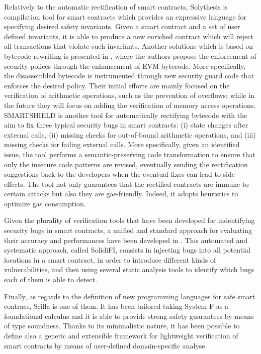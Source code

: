 Relatively to the automatic rectification of smart contracts, Solythesis \cite{solythesis_solidity_validation} is compilation tool for smart contracts which provides an expressive language for specifying desired safety invariants. Given a smart contract and a set of user defined invariants, it is able to produce a new enriched contract which will reject all transactions that violate such invariants.
%
Another solutions which is based on bytecode rewriting is presented in \cite{bytecode_rewriting}, where the authors propose the enforcement of security polices through the enhancement of EVM bytecode. More specifically, the disassembled bytecode is instrumented through new security guard code that enforces the desired policy. Their initial efforts are mainly focused on the  verification of arithmetic operations, such as the prevention of overflows; while in the future they will focus on
adding the verification of memory access operations.
%
SMARTSHIELD \cite{smartshield} is another tool for automatically rectifying bytecode with the aim to fix three typical security bugs in smart contracts:
(i) state changes after external calls, (ii) missing checks for out-of-bound arithmetic operations, and (iii) missing checks for failing external calls. More specifically, given an identified issue, the tool performs a semantic-preserving code transformation to ensure that only the insecure code patterns are revised, eventually  sending the rectification suggestions back to the developers when the eventual fixes can lead to side effects. The tool not only guarantees that the rectified contracts are immune to certain attacks but also they are gas-friendly. Indeed, it adopts heuristics to optimize gas consumption. 

Given the plurality of verification tools that have been developed for indentifying security bugs in smart contracts, a unified and standard approach for evaluating their accuracy and performances have been developed in \cite{effectiveness_analysis_tools}. This automated and systematic approach, called SolidiFI, consists in injecting bugs into all potential locations in a smart contract, in order to introduce different kinds of vulnerabilities, and then using several static analysis tools to identify which bugs each of them is able to detect.




Finally, as regards to the definition of new programming languages for safe smart contracs,  Scilla \cite{scilla} is one of them. It has been tailored taking   System F as a foundational calculus and it is able to provide strong safety guarantees by means of type soundness. Thanks to its minimalistic nature, it has been possible to define also a generic and extensible framework for lightweight verification of smart contracts by means of user-defined domain-specific analyse. 




